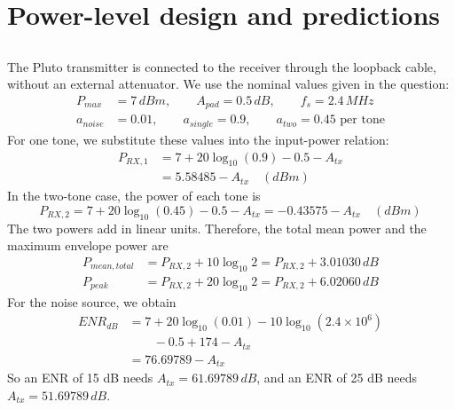 \documentclass[]{article}
\begin{document}
    \newpage

    \section{Power-level design and predictions}
    \subsection{}
    The Pluto transmitter is connected to the receiver through the loopback cable, without an external attenuator. We use the nominal values given in the question:
    \begin{equation*}
        \begin{split}
        P_{max}&=7\,dBm,\qquad A_{pad}=0.5\,dB,\qquad f_s=2.4\,MHz\\
        a_{noise}&=0.01,\qquad a_{single}=0.9,\qquad a_{two}=0.45\text{ per tone}
        \end{split}
    \end{equation*}
    For one tone, we substitute these values into the input-power relation:
    \begin{equation*}
        \begin{split}
        P_{RX,1}&=7+20\log_{10}(0.9)-0.5-A_{tx}\\
                &=5.58485-A_{tx}\quad(dBm)
        \end{split}
    \end{equation*}
    In the two-tone case, the power of each tone is
    \begin{equation*}
        P_{RX,2}=7+20\log_{10}(0.45)-0.5-A_{tx}
                 =-0.43575-A_{tx}\quad(dBm)
    \end{equation*}
    The two powers add in linear units. Therefore, the total mean power and the maximum envelope power are
    \begin{equation*}
        \begin{split}
        P_{mean,total}&=P_{RX,2}+10\log_{10}2=P_{RX,2}+3.01030\,dB\\
        P_{peak}&=P_{RX,2}+20\log_{10}2=P_{RX,2}+6.02060\,dB
        \end{split}
    \end{equation*}
    For the noise source, we obtain
    \begin{equation*}
        \begin{split}
        ENR_{dB}&=7+20\log_{10}(0.01)-10\log_{10}(2.4\times10^6)\\
        &\qquad-0.5+174-A_{tx}\\
        &=76.69789-A_{tx}
        \end{split}
    \end{equation*}
    So an ENR of 15 dB needs $A_{tx}=61.69789\,dB$, and an ENR of 25 dB needs $A_{tx}=51.69789\,dB$.
\end{document}
